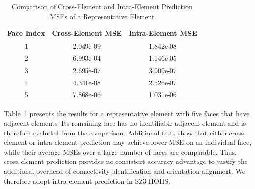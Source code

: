         

\begin{table}[h]
    \caption{Comparison of Cross-Element and Intra-Element Prediction MSEs of a Representative Element}
    \label{tab:cross-element mse}
    \centering
    \begin{tabular}{c|cc}\toprule
        \textbf{Face Index} & \textbf{Cross-Element MSE} & \textbf{Intra-Element MSE} \\\midrule
        1 & 2.049e-09 & 1.842e-08 \\
        2 & 6.993e-04 & 1.146e-05\\
        3 & 2.695e-07 & 3.909e-07\\
        4 & 4.341e-08 & 2.526e-07\\
        5 & 7.868e-06 & 1.031e-06\\\bottomrule
    \end{tabular}
\end{table}

Table~\ref{tab:cross-element mse} presents the results for a representative element with five faces that have adjacent elements. Its remaining face has no identifiable adjacent element and is therefore excluded from the comparison. Additional tests show that either cross-element or intra-element prediction may achieve lower MSE on an individual face, while their average MSEs over a large number of faces are comparable. Thus, cross-element prediction provides no consistent accuracy advantage to justify the additional overhead of connectivity identification and orientation alignment. We therefore adopt intra-element prediction in SZ3-HOHS.